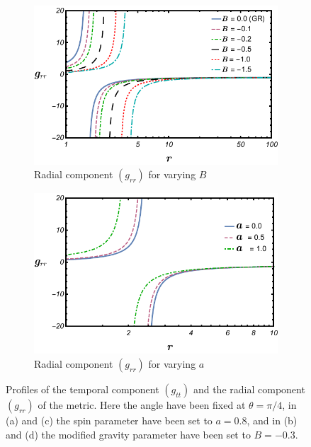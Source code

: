 \documentclass[12pt,a4paper,oneside]{book}
\begin{document}
\begin{figure}[t]
\begin{subfigure}[b]{0.5\textwidth}
         \includegraphics[width=\textwidth]{radial_var_B_a.pdf}
	\caption{Radial component $(g_{rr})$ for varying $B$}
    		\label{radial_var_B_a}
     \end{subfigure}
 \begin{subfigure}[b]{0.5\textwidth}
         \centering
         \includegraphics[width=\textwidth]{radial_var_a_B.pdf}
	\caption{Radial component $(g_{rr})$ for varying $a$}
    		\label{radial_var_a_B}
     \end{subfigure}
     \caption{Profiles of the temporal component $(g_{tt})$ and the radial component $(g_{rr})$ of the metric. Here the angle have been fixed at $\theta=\pi/4$, in (a) and (c) the spin parameter have been set to $a=0.8$, and in (b) and (d) the modified gravity parameter have been set to $B=-0.3$.}
        \label{TR four graphs}
\end{figure}
\end{document}
